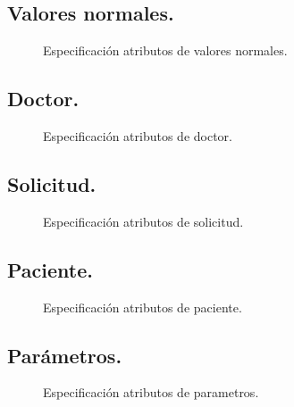 \documentclass[a4paper,10pt]{article}
\begin{document}
\subsection{Valores normales.}
\begin{figure}[hbt]
	\begin{center}
		\scalebox{0.5}{}
	\end{center}
	\caption{Especificación atributos de valores normales.}
	\label{fig:spec_valores_normales}
\end{figure}
\subsection{Doctor.}
\begin{figure}[hbt]
	\begin{center}
		\scalebox{0.5}{}
	\end{center}
	\caption{Especificación atributos de doctor.}
	\label{fig:spec_doctor}
\end{figure}
\subsection{Solicitud.}
\begin{figure}[hbt]
	\begin{center}
		\scalebox{0.5}{}
	\end{center}
	\caption{Especificación atributos de solicitud.}
	\label{fig:spec_solicitud}
\end{figure}
\pagebreak
\subsection{Paciente.}
\begin{figure}[hbt]
	\begin{center}
		\scalebox{0.5}{}
	\end{center}
	\caption{Especificación atributos de paciente.}
	\label{fig:spec_paciente}
\end{figure}
\subsection{Parámetros.}
\begin{figure}[hbt]
	\begin{center}
		\scalebox{0.5}{}
	\end{center}
	\caption{Especificación atributos de parametros.}
	\label{fig:spec_parametros}
\end{figure}
\end{document}
